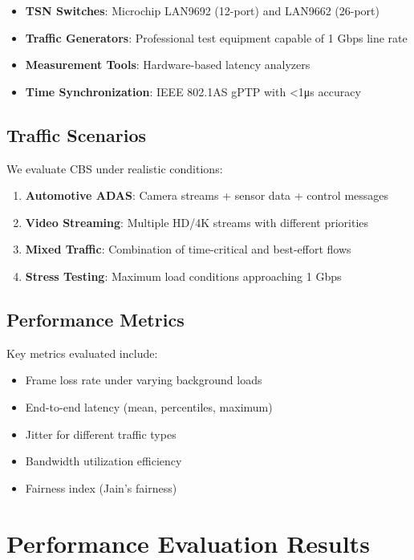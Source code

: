 \documentclass[10pt, journal, compsoc]{IEEEtran}
\begin{document}
\begin{itemize}
    \item \textbf{TSN Switches}: Microchip LAN9692 (12-port) and LAN9662 (26-port)
    \item \textbf{Traffic Generators}: Professional test equipment capable of 1 Gbps line rate
    \item \textbf{Measurement Tools}: Hardware-based latency analyzers
    \item \textbf{Time Synchronization}: IEEE 802.1AS gPTP with <1μs accuracy
\end{itemize}

\subsection{Traffic Scenarios}

We evaluate CBS under realistic conditions:

\begin{enumerate}
    \item \textbf{Automotive ADAS}: Camera streams + sensor data + control messages
    \item \textbf{Video Streaming}: Multiple HD/4K streams with different priorities
    \item \textbf{Mixed Traffic}: Combination of time-critical and best-effort flows
    \item \textbf{Stress Testing}: Maximum load conditions approaching 1 Gbps
\end{enumerate}

\subsection{Performance Metrics}

Key metrics evaluated include:

\begin{itemize}
    \item Frame loss rate under varying background loads
    \item End-to-end latency (mean, percentiles, maximum)
    \item Jitter for different traffic types
    \item Bandwidth utilization efficiency
    \item Fairness index (Jain's fairness)
\end{itemize}

\section{Performance Evaluation Results}
\end{document}
